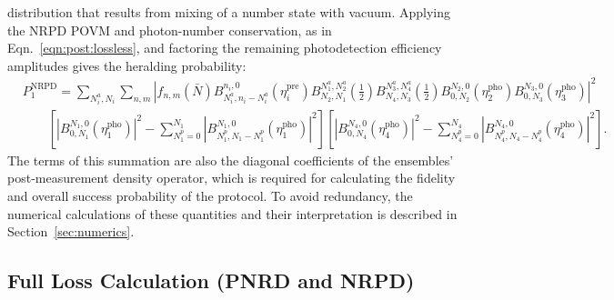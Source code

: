 \documentclass[aps,twocolumn,secnumarabic,amsmath,amssymb,pra,groupedaddress,
showpacs, showkeys,draft]{revtex4-1}
\newcommand{\pna}[1]{\left(#1\right)}
\newcommand{\pnb}[1]{\left[#1\right]}
\newcommand{\abs}[1]{\left|#1\right|}
\begin{document}
\begin{widetext}
distribution that results from mixing of a number state with vacuum. Applying
the NRPD POVM and photon-number conservation, as in
Eqn.~\ref{eqn:post:lossless}, and factoring the remaining photodetection
efficiency amplitudes gives the heralding probability:
\begin{align}
	&P_{1}^{\textrm{NRPD}}= \sum_{N_i^a,N_i}\sum_{n,m}
	\left|f_{n,m}\pna{\bar{N}}
	B_{N_i^a,n_i-N_i^a}^{n_i,0}\pna{\eta_i^{\textrm{pre}}}
	B_{N_2,N_1}^{N_1^a,N_2^a}\pna{\frac{1}{2}}
	B_{N_4,N_3}^{N_3^a,N_4^a}\pna{\frac{1}{2}} 
	B_{0,N_2}^{N_2,0}\pna{\eta_2^{\textrm{pho}}} 
	B_{0,N_3}^{N_3,0}\pna{\eta_3^{\textrm{pho}}}\right|^2\nonumber \\
	&  \qquad \pnb{\abs{B_{0,N_1}^{N_1,0}\pna{\eta_1^{\textrm{pho}}}}^2-\sum_{N_1^p=0}^{N_1} \abs{B_{N_1^p,N_1-N_1^p}^{N_1,0}\pna{\eta_1^{\textrm{pho}}}}^2} \pnb{\abs{B_{0,N_4}^{N_4,0}\pna{\eta_4^{\textrm{pho}}}}^2-\sum_{N_4^p=0}^{N_4} \abs{B_{N_4^p,N_4-N_4^p}^{N_4,0}\pna{\eta_4^{\textrm{pho}}}}^2}.
\end{align}
The terms of this summation are also the diagonal coefficients of the
ensembles' post-measurement density operator, which is required for calculating
the fidelity and overall success probability of the protocol. To avoid
redundancy, the numerical calculations of these quantities and their
interpretation is described in Section~\ref{sec:numerics}. 

\subsection{Full Loss Calculation (PNRD and NRPD)~\label{sec:numerics}}


\end{widetext}
\end{document}
